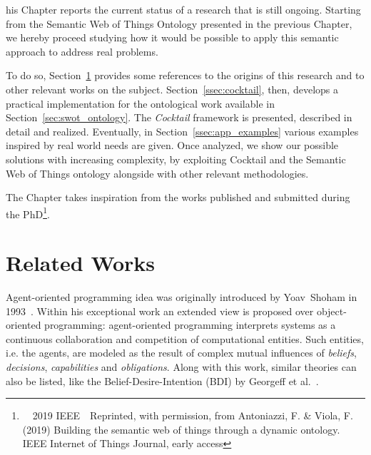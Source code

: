 his Chapter reports the current status of a research that is still ongoing. Starting from the Semantic Web of Things Ontology presented in the previous Chapter, we hereby proceed studying how it would be possible to apply this semantic approach to address real problems.

To do so, Section~\ref{ssec:61_rw} provides some references to the origins of this research and to other relevant works on the subject. Section~\ref{ssec:cocktail}, then, develops a practical implementation for the ontological work available in Section~\ref{sec:swot_ontology}. The \textit{Cocktail} framework is presented, described in detail and realized. Eventually, in Section~\ref{ssec:app_examples} various examples inspired by real world needs are given. Once analyzed, we show our possible solutions with increasing complexity, by exploiting Cocktail and the Semantic Web of Things ontology alongside with other relevant methodologies.

The Chapter takes inspiration from the works published and submitted during the PhD\footnote{~\faCopyright~2019 IEEE~~Reprinted, with permission, from Antoniazzi, F. \& Viola, F. (2019) Building the semantic web
of things through a dynamic ontology. IEEE Internet of Things Journal, early access}.

\section{Related Works}
\label{ssec:61_rw}
Agent-oriented programming idea was originally introduced by Yoav~Shoham in 1993~\cite{shoham1993agent}. Within his exceptional work an extended view is proposed over object-oriented programming: agent-oriented programming interprets systems as a continuous collaboration and competition of computational entities. Such entities, i.e. the agents, are modeled as the result of complex mutual influences of \textit{beliefs}, \textit{decisions}, \textit{capabilities} and \textit{obligations}. Along with this work, similar theories can also be listed, like the Belief-Desire-Intention (BDI) by Georgeff et al.~\cite{georgeff1998belief}.

